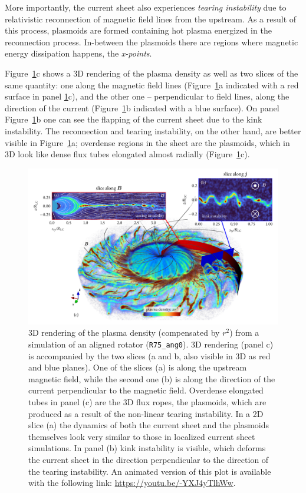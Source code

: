 More importantly, the current sheet also experiences \emph{tearing instability} due to relativistic reconnection of magnetic field lines from the upstream. As a result of this process, plasmoids are formed containing hot plasma energized in the reconnection process. In-between the plasmoids there are regions where magnetic energy dissipation happens, the \emph{x-points}.

Figure~\ref{fig:psr-pulsar3d}c shows a 3D rendering of the plasma density as well as two slices of the same quantity: one along the magnetic field lines (Figure~\ref{fig:psr-pulsar3d}a indicated with a red surface in panel \ref{fig:psr-pulsar3d}c), and the other one -- perpendicular to field lines, along the direction of the current (Figure~\ref{fig:psr-pulsar3d}b indicated with a blue surface). On panel Figure~\ref{fig:psr-pulsar3d}b one can see the flapping of the current sheet due to the kink instability. The reconnection and tearing instability, on the other hand, are better visible in Figure~\ref{fig:psr-pulsar3d}a; overdense regions in the sheet are the plasmoids, which in 3D look like dense flux tubes elongated almost radially (Figure~\ref{fig:psr-pulsar3d}c). 

\begin{figure}[htb]
\centering
\includegraphics[width=\columnwidth,trim={10 10 10 5},clip]{figures/ch3-pulsar/fig3.pdf}
\caption{3D rendering of the plasma density (compensated by $r^2$) from a simulation of an aligned rotator (\texttt{R75\_ang0}). 3D rendering (panel c) is accompanied by the two slices (a and b, also visible in 3D as red and blue planes). One of the slices (a) is along the upstream magnetic field, while the second one (b) is along the direction of the current perpendicular to the magnetic field. Overdense elongated tubes in panel (c) are the 3D flux ropes, the plasmoids, which are produced as a result of the non-linear tearing instability. In a 2D slice (a) the dynamics of both the current sheet and the plasmoids themselves look very similar to those in localized current sheet simulations. In panel (b) kink instability is visible, which deforms the current sheet in the direction perpendicular to the direction of the tearing instability. An animated version of this plot is available with the following link: \url{https://youtu.be/-YXJ4yTlhWw}.}
\label{fig:psr-pulsar3d}
\end{figure}

